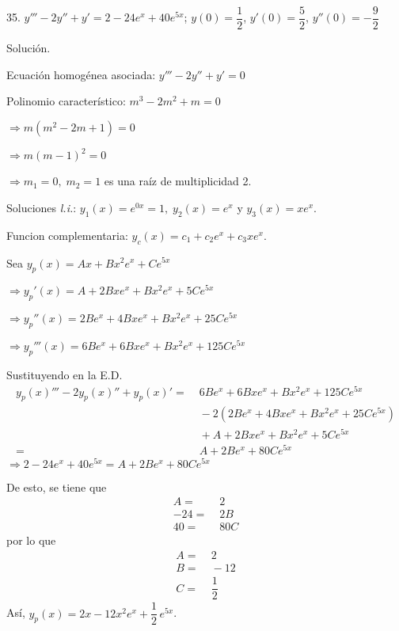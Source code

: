 \documentclass[fleqn]{article}
\begin{document}
 
    35. $ y''' - 2y'' + y' = 2 - 24e^x + 40e^{5x} $; \; $ y(0) = \dfrac{1}{2} $, \; $ y'(0) = \dfrac{5}{2} $, \; $ y''(0) = - \dfrac{9}{2} $

    Solución.

    Ecuación homogénea asociada: $ y''' - 2y'' + y' = 0 $

    Polinomio característico: $ m^3 - 2m^2 + m = 0 $

    \hspace{3.2cm} $ \Longrightarrow m(m^2 - 2m + 1) = 0 $

    \hspace{3.2cm} $ \Longrightarrow m(m - 1)^2 = 0 $

    \hspace{3.2cm} $ \Longrightarrow m_1 = 0, \; m_2 = 1 $ es una raíz de multiplicidad 2.

    Soluciones \textit{l.i.}: $ y_1(x) = e^{0x} = 1, \; y_2(x) = e^x $ y $ y_3(x) = xe^x $.

    Funcion complementaria: $ y_c(x) = c_1 + c_2e^x + c_3xe^x $.

    Sea $ y_p(x) = Ax + Bx^2e^x + Ce^{5x} $

    $ \Longrightarrow y_p'(x) = A + 2Bxe^x + Bx^2e^x + 5Ce^{5x} $

    $ \Longrightarrow y_p''(x) = 2Be^x + 4Bxe^x + Bx^2e^x + 25Ce^{5x} $

    $ \Longrightarrow y_p'''(x) = 6Be^x + 6Bxe^x + Bx^2e^x + 125Ce^{5x} $

    Sustituyendo en la E.D.
    \begin{align*}
        y_p(x)''' - 2y_p(x)'' + y_p(x)' =& \; 6Be^x + 6Bxe^x + Bx^2e^x + 125Ce^{5x} \\ & \; - 2 \left(2Be^x + 4Bxe^x + Bx^2e^x  + 25Ce^{5x} \right) \\ & \; + A + 2Bxe^x + Bx^2e^x + 5Ce^{5x} \\
        =& \; A + 2Be^x + 80Ce^{5x}
    \end{align*}
    $ \Longrightarrow 2 - 24e^x + 40e^{5x} = A + 2Be^x + 80Ce^{5x} $

    De esto, se tiene que 
    \begin{align*}
        A =& \; 2 \\
        -24 =& \; 2B \\
        40 =& \; 80C
    \end{align*}
    por lo que
    \begin{align*}
        A =& \; 2 \\
        B =& \; -12 \\
        C =& \; \dfrac{1}{2}
    \end{align*}
    Así, $ y_p(x) = 2x - 12x^2e^x + \dfrac{1}{2} \, e^{5x} $.
\end{document}
